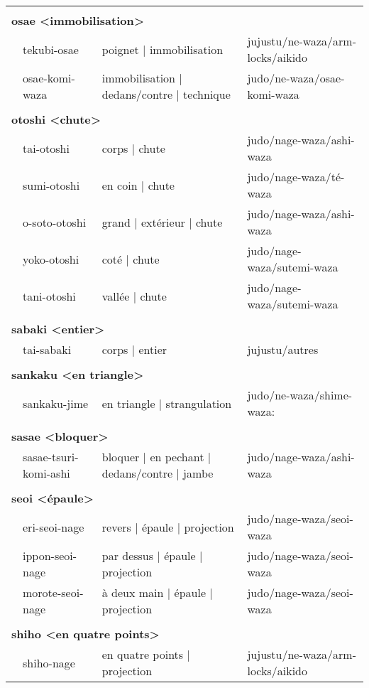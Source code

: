 \documentclass{article}%
\begin{document}
\begin{longtable}{rlll}
&&&\\%
\multicolumn{3}{l}{\textbf{osae <immobilisation>}%
~%
}&\\%
&tekubi{-}osae&poignet | immobilisation&jujustu/ne{-}waza/arm{-}locks/aikido\\%
&osae{-}komi{-}waza&immobilisation | dedans/contre | technique&judo/ne{-}waza/osae{-}komi{-}waza\\%
&&&\\%
\multicolumn{3}{l}{\textbf{otoshi <chute>}%
~%
}&\\%
&tai{-}otoshi&corps | chute&judo/nage{-}waza/ashi{-}waza\\%
&sumi{-}otoshi&en coin | chute&judo/nage{-}waza/té{-}waza\\%
&o{-}soto{-}otoshi&grand | extérieur | chute&judo/nage{-}waza/ashi{-}waza\\%
&yoko{-}otoshi&coté | chute&judo/nage{-}waza/sutemi{-}waza\\%
&tani{-}otoshi&vallée | chute&judo/nage{-}waza/sutemi{-}waza\\%
&&&\\%
\multicolumn{3}{l}{\textbf{sabaki <entier>}%
~%
}&\\%
&tai{-}sabaki&corps | entier&jujustu/autres\\%
&&&\\%
\multicolumn{3}{l}{\textbf{sankaku <en triangle>}%
~%
}&\\%
&sankaku{-}jime&en triangle | strangulation&judo/ne{-}waza/shime{-}waza:\\%
&&&\\%
\multicolumn{3}{l}{\textbf{sasae <bloquer>}%
~%
}&\\%
&sasae{-}tsuri{-}komi{-}ashi&bloquer | en pechant | dedans/contre | jambe&judo/nage{-}waza/ashi{-}waza\\%
&&&\\%
\multicolumn{3}{l}{\textbf{seoi <épaule>}%
~%
}&\\%
&eri{-}seoi{-}nage&revers | épaule | projection&judo/nage{-}waza/seoi{-}waza\\%
&ippon{-}seoi{-}nage&par dessus | épaule | projection&judo/nage{-}waza/seoi{-}waza\\%
&morote{-}seoi{-}nage&à deux main | épaule | projection&judo/nage{-}waza/seoi{-}waza\\%
&&&\\%
\multicolumn{3}{l}{\textbf{shiho <en quatre points>}%
~%
}&\\%
&shiho{-}nage&en quatre points | projection&jujustu/ne{-}waza/arm{-}locks/aikido\\%

\end{longtable}
\end{document}
